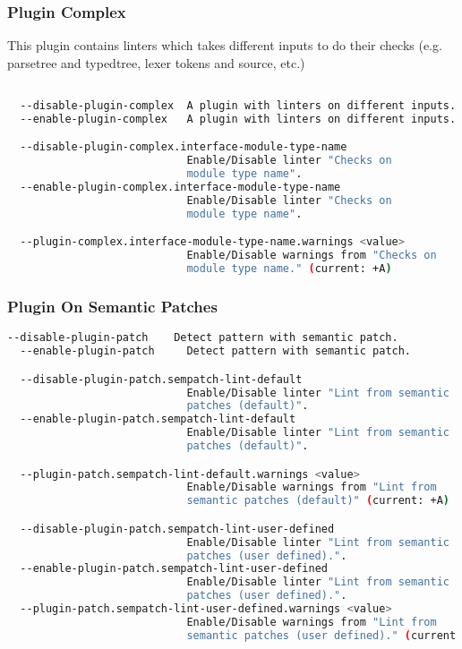 \subsubsection*{Plugin Complex}
This plugin contains linters which takes different inputs to do their checks
(e.g. parsetree and typedtree, lexer tokens and source, etc.)

\begin{lstlisting}[language=bash,basicstyle=\tt\small,showspaces=false,showstringspaces=false]

  --disable-plugin-complex  A plugin with linters on different inputs.
  --enable-plugin-complex   A plugin with linters on different inputs.

  --disable-plugin-complex.interface-module-type-name  
                            Enable/Disable linter "Checks on 
                            module type name".
  --enable-plugin-complex.interface-module-type-name  
                            Enable/Disable linter "Checks on 
                            module type name".

  --plugin-complex.interface-module-type-name.warnings <value> 
                            Enable/Disable warnings from "Checks on 
                            module type name." (current: +A)
\end{lstlisting}


\subsubsection*{Plugin On Semantic Patches}
\begin{lstlisting}[language=bash,basicstyle=\tt\small,showspaces=false,showstringspaces=false]
  --disable-plugin-patch    Detect pattern with semantic patch.
  --enable-plugin-patch     Detect pattern with semantic patch.

  --disable-plugin-patch.sempatch-lint-default  
                            Enable/Disable linter "Lint from semantic 
                            patches (default)".
  --enable-plugin-patch.sempatch-lint-default  
                            Enable/Disable linter "Lint from semantic 
                            patches (default)".

  --plugin-patch.sempatch-lint-default.warnings <value> 
                            Enable/Disable warnings from "Lint from 
                            semantic patches (default)" (current: +A)

  --disable-plugin-patch.sempatch-lint-user-defined  
                            Enable/Disable linter "Lint from semantic 
                            patches (user defined).".
  --enable-plugin-patch.sempatch-lint-user-defined  
                            Enable/Disable linter "Lint from semantic 
                            patches (user defined).".
  --plugin-patch.sempatch-lint-user-defined.warnings <value> 
                            Enable/Disable warnings from "Lint from 
                            semantic patches (user defined)." (current: +A)
\end{lstlisting}

